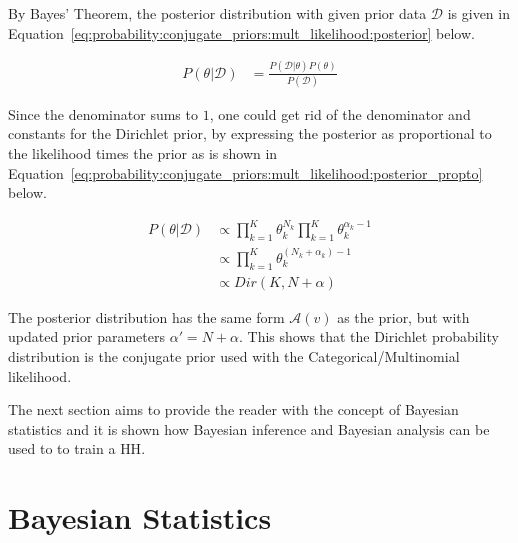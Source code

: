 \noindent
By Bayes' Theorem, the posterior distribution with given prior data $\mathcal{D}$ is given in Equation~\eqref{eq:probability:conjugate_priors:mult_likelihood:posterior} below.

\begin{equation}
      \label{eq:probability:conjugate_priors:mult_likelihood:posterior}
      \begin{split}
            P(\theta \vert \mathcal{D}) &= \frac{P(\mathcal{D} \vert \theta) P(\theta)}{P(\mathcal{D})}
      \end{split}
\end{equation}

\noindent
Since the denominator sums to $1$, one could get rid of the denominator and constants for the Dirichlet prior, by expressing the posterior as proportional to the likelihood times the prior as is shown in Equation~\eqref{eq:probability:conjugate_priors:mult_likelihood:posterior_propto} below.

\begin{equation}
      \label{eq:probability:conjugate_priors:mult_likelihood:posterior_propto}
      \begin{split}
            P(\theta \vert \mathcal{D}) &\propto \prod_{k=1}^{K} \theta_{k}^{N_{k}} \prod_{k=1}^{K} \theta_{k}^{\alpha_{k} - 1}\\
            &\propto \prod_{k=1}^{K} \theta_{k}^{(N_{k} + \alpha_{k}) - 1} \\
            &\propto Dir(K, N + \alpha)
      \end{split}
\end{equation}

\noindent
The posterior distribution has the same form $\mathcal{A}(v)$ as the prior, but with updated prior parameters $\alpha' = N + \alpha$. This shows that the Dirichlet probability distribution is the conjugate prior used with the Categorical/Multinomial likelihood.

The next section aims to provide the reader with the concept of Bayesian statistics and it is shown how Bayesian inference and Bayesian analysis can be used to to train a \acs{HH}.


\section{Bayesian Statistics}
\label{sec:probability:bayesian_statistics}

